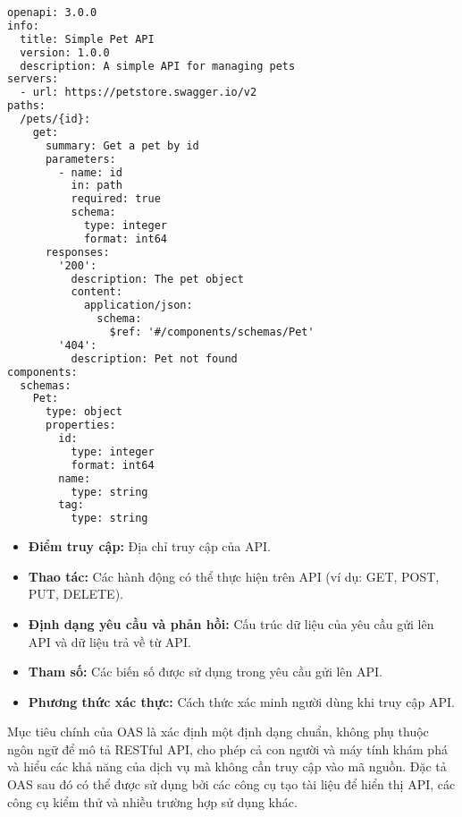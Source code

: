 \begin{lstlisting}[language=HTML,firstnumber=1,caption={Đặc tả OpenAPI},label={lst:openapi_example}]
openapi: 3.0.0
info:
  title: Simple Pet API
  version: 1.0.0
  description: A simple API for managing pets
servers:
  - url: https://petstore.swagger.io/v2
paths:
  /pets/{id}:
    get:
      summary: Get a pet by id
      parameters:
        - name: id
          in: path
          required: true
          schema:
            type: integer
            format: int64
      responses:
        '200':
          description: The pet object
          content:
            application/json:
              schema:
                $ref: '#/components/schemas/Pet'
        '404':
          description: Pet not found
components:
  schemas:
    Pet:
      type: object
      properties:
        id:
          type: integer
          format: int64
        name:
          type: string
        tag:
          type: string

\end{lstlisting}


\begin{itemize}
\item \textbf{Điểm truy cập:} Địa chỉ truy cập của API.
\item \textbf{Thao tác:} Các hành động có thể thực hiện trên API (ví dụ: GET, POST, PUT, DELETE).
\item \textbf{Định dạng yêu cầu và phản hồi:} Cấu trúc dữ liệu của yêu cầu gửi lên API và dữ liệu trả về từ API.
\item \textbf{Tham số:} Các biến số được sử dụng trong yêu cầu gửi lên API.
\item \textbf{Phương thức xác thực:} Cách thức xác minh người dùng khi truy cập API.

\end{itemize}
Mục tiêu chính của OAS là xác định một định dạng chuẩn, không phụ thuộc ngôn ngữ để mô tả RESTful API, cho phép cả con người và máy tính khám phá và hiểu các khả năng của dịch vụ mà không cần truy cập vào mã nguồn. Đặc tả OAS sau đó có thể được sử dụng bởi các công cụ tạo tài liệu để hiển thị API, các công cụ kiểm thử và nhiều trường hợp sử dụng khác.


